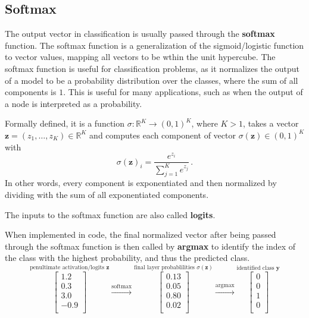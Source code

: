 \documentclass[12pt]{report}
\theoremstyle{definition}
\theoremstyle{remark}
\begin{document}
\subsection{Softmax}
The output vector in classification is usually passed through the \textbf{softmax} function. The softmax function is a generalization of the sigmoid/logistic function to vector values, mapping all vectors to be wthin the unit hypercube. The softmax function is useful for classification problems, as it normalizes the output of a model to be a probability distribution over the classes, where the sum of all components is $1$. This is useful for many applications, such as when the output of a node is interpreted as a probability.

Formally defined, it is a function $\sigma\colon \mathbb{R}^K \to (0, 1)^K$, where $K > 1$, takes a vector $\mathbf{z} = (z_1, \dotsc, z_K) \in \mathbb{R}^K$ and computes each component of vector $\sigma(\mathbf{z}) \in (0, 1)^K$ with
\begin{equation}
\sigma(\mathbf{z})_i = \frac{e^{z_i}}{\sum_{j=1}^K e^{z_j}}\,.
\end{equation}
In other words, every component is exponentiated and then normalized by dividing with the sum of all exponentiated components.

The inputs to the softmax function are also called \textbf{logits}.

When implemented in code, the final normalized vector after being passed through the softmax function is then called by \textbf{argmax} to identify the index of the class with the highest probability, and thus the predicted class.
\begin{equation}
    \stackrel{\mbox{penultimate activation/logits $\mathbf{z}$}}{\begin{bmatrix}
        1.2 \\
        0.3 \\
        3.0 \\
        -0.9 \\
    \end{bmatrix}}
    \xrightarrow{\text{softmax}}
    \stackrel{\mbox{final layer probablilities $\sigma({\mathbf{z}})$}}{\begin{bmatrix}
        0.13 \\
        0.05 \\
        0.80 \\
        0.02 \\
    \end{bmatrix}}
    \xrightarrow{\text{argmax}}
    \stackrel{\mbox{identified class $\mathbf{y}$}}{\begin{bmatrix}
        0 \\
        0 \\
        1 \\
        0 \\
    \end{bmatrix}}
\end{equation}
\end{document}
